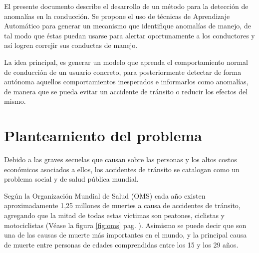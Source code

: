 
El presente documento describe el desarrollo de un m\'{e}todo para la detecci\'{o}n de anomal\'{i}as en la conducci\'{o}n. Se propone el uso de t\'{e}cnicas de Aprendizaje Autom\'{a}tico para generar un mecanismo que identifique anomal\'{i}as de manejo, de tal modo que \'{e}stas puedan usarse para alertar oportunamente a los conductores y as\'{i} logren correjir sus conductas de manejo.

\vspace{5mm} %

La idea principal, es generar un modelo que aprenda el comportamiento normal de conducci\'{o}n de un usuario concreto, para posteriormente detectar de forma aut\'{o}noma aquellos comportamientos inesperados e informarlos como anomal\'{i}as, de manera que se pueda evitar  un accidente de tr\'{a}nsito o reducir los efectos del mismo.

\section{Planteamiento del problema}

Debido a las graves secuelas que causan sobre las personas y los altos costos econ\'{o}micos asociados a ellos, los accidentes de tr\'{a}nsito se catalogan como un problema social y de salud p\'{u}blica mundial.

\vspace{5mm} %

Seg\'{u}n la Organizaci\'{o}n Mundial de Salud (OMS) cada a\~{n}o existen aproximadamente 1,25 millones de muertes a causa de accidentes de tr\'{a}nsito, agregando que la mitad de todas estas victimas son peatones, ciclistas y motociclistas (V\'{e}ase la figura \ref{fig:oms} pag. \pageref{fig:oms}). Asimismo se puede decir que son una de las causas de muerte más importantes en el mundo, y la principal causa de muerte entre personas de edades comprendidas entre los 15 y los 29 años. 

\vspace{5mm} %

